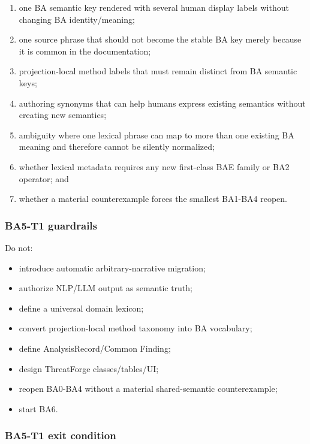 \documentclass[
  11pt,
  a4paper,
]{article}
\providecommand{\tightlist}{%
  \setlength{\itemsep}{0pt}\setlength{\parskip}{0pt}}
\begin{document}
\begin{enumerate}
\def\labelenumi{\arabic{enumi}.}
\tightlist
\item
  one BA semantic key rendered with several human display labels without
  changing BA identity/meaning;
\item
  one source phrase that should not become the stable BA key merely
  because it is common in the documentation;
\item
  projection-local method labels that must remain distinct from BA
  semantic keys;
\item
  authoring synonyms that can help humans express existing semantics
  without creating new semantics;
\item
  ambiguity where one lexical phrase can map to more than one existing
  BA meaning and therefore cannot be silently normalized;
\item
  whether lexical metadata requires any new first-class BAE family or
  BA2 operator; and
\item
  whether a material counterexample forces the smallest BA1-BA4 reopen.
\end{enumerate}

\subsubsection{BA5-T1 guardrails}\label{ba5-t1-guardrails}

Do not:

\begin{itemize}
\tightlist
\item
  introduce automatic arbitrary-narrative migration;
\item
  authorize NLP/LLM output as semantic truth;
\item
  define a universal domain lexicon;
\item
  convert projection-local method taxonomy into BA vocabulary;
\item
  define AnalysisRecord/Common Finding;
\item
  design ThreatForge classes/tables/UI;
\item
  reopen BA0-BA4 without a material shared-semantic counterexample;
\item
  start BA6.
\end{itemize}

\subsubsection{BA5-T1 exit condition}\label{ba5-t1-exit-condition}
\end{document}
